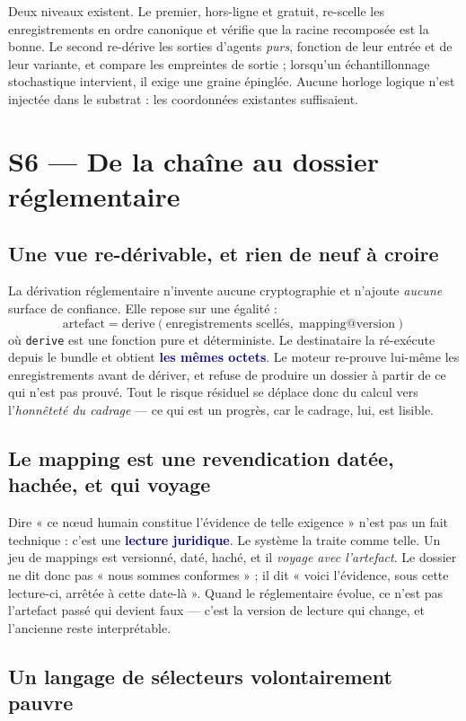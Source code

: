 \documentclass[10pt]{article}
\newcommand{\code}[1]{\texttt{\small #1}}
\newcommand{\mm}[1]{\textbf{\textcolor{navy}{#1}}}
\begin{document}
Deux niveaux existent. Le premier, hors-ligne et gratuit, re-scelle les enregistrements en ordre canonique et vérifie que la racine recomposée est la bonne. Le second re-dérive les sorties d'agents \emph{purs}, fonction de leur entrée et de leur variante, et compare les empreintes de sortie ; lorsqu'un échantillonnage stochastique intervient, il exige une graine épinglée. Aucune horloge logique n'est injectée dans le substrat : les coordonnées existantes suffisaient.

\section{S6 — De la chaîne au dossier réglementaire}

\subsection{Une vue re-dérivable, et rien de neuf à croire}

La dérivation réglementaire n'invente aucune cryptographie et n'ajoute \emph{aucune} surface de confiance. Elle repose sur une égalité : \[ \text{artefact} = \mathrm{derive}(\text{enregistrements scell\'es},\; \text{mapping@version}) \] où \code{derive} est une fonction pure et déterministe. Le destinataire la ré-exécute depuis le bundle et obtient \mm{les mêmes octets}. Le moteur re-prouve lui-même les enregistrements avant de dériver, et refuse de produire un dossier à partir de ce qui n'est pas prouvé. Tout le risque résiduel se déplace donc du calcul vers l'\emph{honnêteté du cadrage} — ce qui est un progrès, car le cadrage, lui, est lisible.

\subsection{Le mapping est une revendication datée, hachée, et qui voyage}

Dire « ce nœud humain constitue l'évidence de telle exigence » n'est pas un fait technique : c'est une \mm{lecture juridique}. Le système la traite comme telle. Un jeu de mappings est versionné, daté, haché, et il \emph{voyage avec l'artefact}. Le dossier ne dit donc pas « nous sommes conformes » ; il dit « voici l'évidence, sous cette lecture-ci, arrêtée à cette date-là ». Quand le réglementaire évolue, ce n'est pas l'artefact passé qui devient faux — c'est la version de lecture qui change, et l'ancienne reste interprétable.

\subsection{Un langage de sélecteurs volontairement pauvre}
\end{document}
